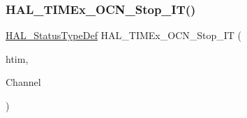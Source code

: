 \subsubsection{\texorpdfstring{H\+A\+L\+\_\+\+T\+I\+M\+Ex\+\_\+\+O\+C\+N\+\_\+\+Stop\+\_\+\+I\+T()}{HAL\_TIMEx\_OCN\_Stop\_IT()}}
{\footnotesize\ttfamily \hyperlink{stm32f4xx__hal__def_8h_a63c0679d1cb8b8c684fbb0632743478f}{H\+A\+L\+\_\+\+Status\+Type\+Def} H\+A\+L\+\_\+\+T\+I\+M\+Ex\+\_\+\+O\+C\+N\+\_\+\+Stop\+\_\+\+IT (\begin{DoxyParamCaption}\item[{\hyperlink{struct_t_i_m___handle_type_def}{T\+I\+M\+\_\+\+Handle\+Type\+Def} $\ast$}]{htim,  }\item[{uint32\+\_\+t}]{Channel }\end{DoxyParamCaption})}

